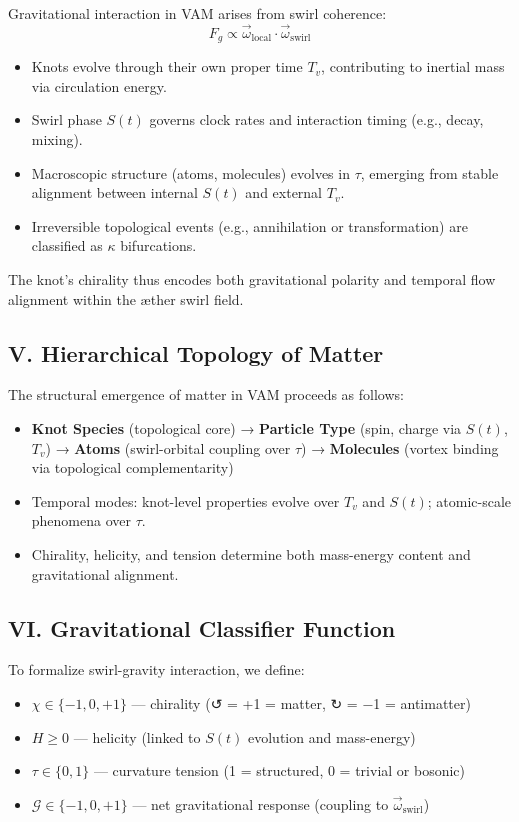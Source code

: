 Gravitational interaction in VAM arises from swirl coherence:
\[
F_g \propto \vec{\omega}_\text{local} \cdot \vec{\omega}_\text{swirl}
\]

\begin{itemize}
 \item  Knots evolve through their own proper time $T_v$, contributing to inertial mass via circulation energy.
 \item  Swirl phase $S(t)$ governs clock rates and interaction timing (e.g., decay, mixing).
 \item  Macroscopic structure (atoms, molecules) evolves in $\tau$, emerging from stable alignment between internal $S(t)$ and external $T_v$.
 \item  Irreversible topological events (e.g., annihilation or transformation) are classified as $\kappa$ bifurcations.
\end{itemize}

The knot’s chirality thus encodes both gravitational polarity and temporal flow alignment within the æther swirl field.


\subsection*{V. Hierarchical Topology of Matter}

The structural emergence of matter in VAM proceeds as follows:

\begin{itemize}
    \item \textbf{Knot Species} (topological core) →
          \textbf{Particle Type} (spin, charge via $S(t)$, $T_v$) →
          \textbf{Atoms} (swirl-orbital coupling over $\tau$) →
          \textbf{Molecules} (vortex binding via topological complementarity)
    \item Temporal modes: knot-level properties evolve over $T_v$ and $S(t)$; atomic-scale phenomena over $\tau$.
    \item Chirality, helicity, and tension determine both mass-energy content and gravitational alignment.
\end{itemize}

\subsection*{VI. Gravitational Classifier Function}

To formalize swirl-gravity interaction, we define:

\begin{itemize}
    \item $\chi \in \{-1, 0, +1\}$ — chirality (↺ = +1 = matter, ↻ = −1 = antimatter)
    \item $H \geq 0$ — helicity (linked to $S(t)$ evolution and mass-energy)
    \item $\tau \in \{0,1\}$ — curvature tension (1 = structured, 0 = trivial or bosonic)
    \item $\mathcal{G} \in \{-1, 0, +1\}$ — net gravitational response (coupling to $\vec{\omega}_\text{swirl}$)
\end{itemize}


